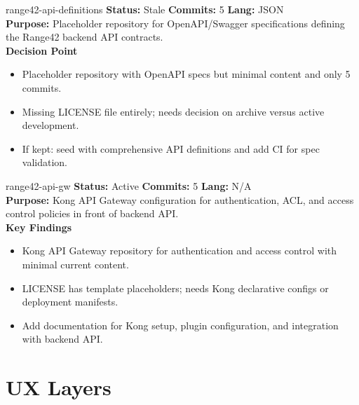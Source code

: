 \documentclass[aspectratio=169]{beamer}
\begin{document}
\begin{frame}{range42-api-definitions \; \faSitemap}
  \textbf{Status:} Stale \hfill \textbf{Commits:} 5 \hfill \textbf{Lang:} JSON\\[2mm]
  \textbf{Purpose:} Placeholder repository for OpenAPI/Swagger specifications defining the Range42 backend API contracts.\\[2mm]
  \textbf{Decision Point}
  \begin{itemize}
    \item Placeholder repository with OpenAPI specs but minimal content and only 5 commits.
    \item Missing LICENSE file entirely; needs decision on archive versus active development.
    \item If kept: seed with comprehensive API definitions and add CI for spec validation.
  \end{itemize}
\end{frame}

\begin{frame}{range42-api-gw \; }
  \textbf{Status:} Active \hfill \textbf{Commits:} 5 \hfill \textbf{Lang:} N/A\\[2mm]
  \textbf{Purpose:} Kong API Gateway configuration for authentication, ACL, and access control policies in front of backend API.\\[2mm]
  \textbf{Key Findings}
  \begin{itemize}
    \item Kong API Gateway repository for authentication and access control with minimal current content.
    \item LICENSE has template placeholders; needs Kong declarative configs or deployment manifests.
    \item Add documentation for Kong setup, plugin configuration, and integration with backend API.
  \end{itemize}
\end{frame}

\section{UX Layers}
\end{document}
